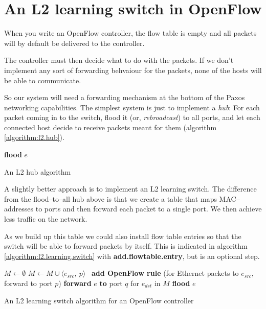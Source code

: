\section{An L2 learning switch in OpenFlow}

When you write an OpenFlow controller, the flow table is empty and all
packets will by default be delivered to the controller.

The controller must then decide what to do with the packets.  If we don't
implement any sort of forwarding behvaiour for the packets, none of the
hosts will be able to communicate.

So our system will need a forwarding mechanism at the bottom of the Paxos
networking capabilities.  The simplest system is just to implement a
\textit{hub}:  For each packet coming in to the switch, flood it (or,
\textit{rebroadcast}) to all ports, and let each connected host decide 
to receive packets meant for them (algorithm \ref{algorithm:l2.hub}).

\begin{algorithm}
  \begin{algorithmic}
      \State \textbf{flood} $e$ 
    \EndOn
  \end{algorithmic}
  \caption{An L2 hub algorithm}
  \label{algorithm:l2.hub}
\end{algorithm}

A slightly better approach is to implement an \ac{L2} learning switch.
The difference from the flood--to--all hub above is that we create a table
that maps MAC--addresses to ports and then forward each packet to a single
port.  We then achieve less traffic on the network.

As we build up this table we could also install flow table entries so that the
switch will be able to forward packets by itself.  This is indicated in
algorithm \vref{algorithm:l2.learning.switch} with
\textbf{add.flowtable.entry}, but is an optional step.

\begin{algorithm}
  \begin{algorithmic}
    \State $M \gets \emptyset$
    \State
      \State $M \gets M \cup \langle e_{src},\ p \rangle$ 
      \State
      \State \textbf{add OpenFlow rule }(for Ethernet packets to
        $e_{src}$, forward to port $p$)
      \State
        \State \textbf{forward} $e$ \textbf{to} port $q$ for $e_{dst}$ in $M$
      \Else
        \State \textbf{flood} $e$ 
      \EndIf
    \EndOn
  \end{algorithmic}
  \caption{An L2 learning switch algorithm for an OpenFlow controller}
  \label{algorithm:l2.learning.switch}
\end{algorithm}

